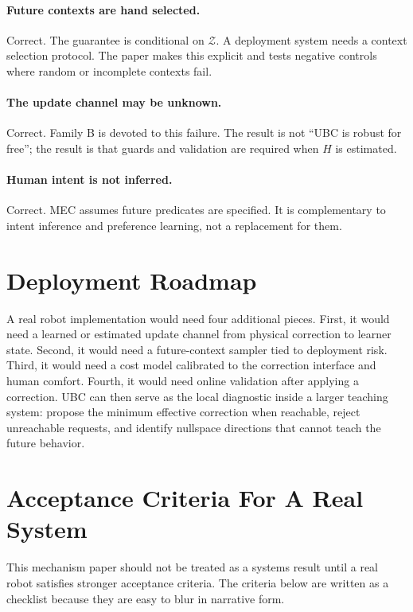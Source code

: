 \documentclass{article}
\begin{document}
\paragraph{Future contexts are hand selected.}
Correct. The guarantee is conditional on $\mathcal{Z}$. A deployment system
needs a context selection protocol. The paper makes this explicit and tests
negative controls where random or incomplete contexts fail.

\paragraph{The update channel may be unknown.}
Correct. Family B is devoted to this failure. The result is not ``UBC is robust
for free''; the result is that guards and validation are required when $H$ is
estimated.

\paragraph{Human intent is not inferred.}
Correct. MEC assumes future predicates are specified. It is complementary to
intent inference and preference learning, not a replacement for them.

\section{Deployment Roadmap}

A real robot implementation would need four additional pieces. First, it would
need a learned or estimated update channel from physical correction to learner
state. Second, it would need a future-context sampler tied to deployment risk.
Third, it would need a cost model calibrated to the correction interface and
human comfort. Fourth, it would need online validation after applying a
correction. UBC can then serve as the local diagnostic inside a larger teaching
system: propose the minimum effective correction when reachable, reject
unreachable requests, and identify nullspace directions that cannot teach the
future behavior.

\section{Acceptance Criteria For A Real System}

This mechanism paper should not be treated as a systems result until a real
robot satisfies stronger acceptance criteria. The criteria below are written as
a checklist because they are easy to blur in narrative form.
\end{document}
